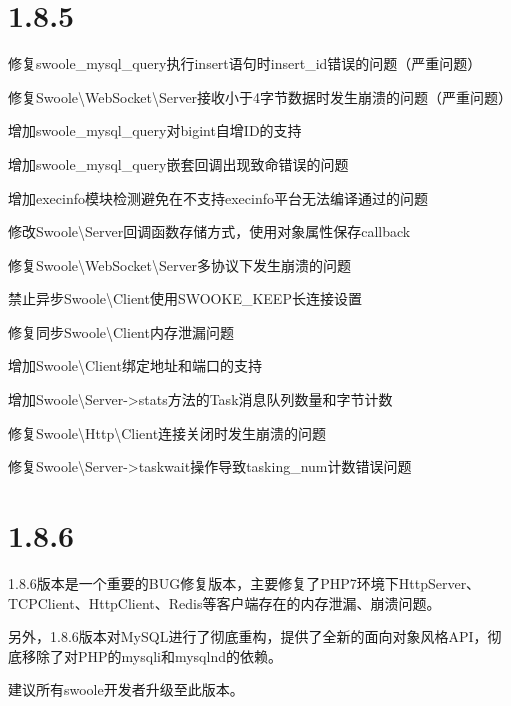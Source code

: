 \section{1.8.5}


\begin{compactitem}
\item 修复swoole\_mysql\_query执行insert语句时insert\_id错误的问题（严重问题）
\item 修复Swoole\textbackslash WebSocket\textbackslash Server接收小于4字节数据时发生崩溃的问题（严重问题）
\item 增加swoole\_mysql\_query对bigint自增ID的支持
\item 增加swoole\_mysql\_query嵌套回调出现致命错误的问题
\item 增加execinfo模块检测避免在不支持execinfo平台无法编译通过的问题
\item 修改Swoole\textbackslash Server回调函数存储方式，使用对象属性保存callback
\item 修复Swoole\textbackslash WebSocket\textbackslash Server多协议下发生崩溃的问题
\item 禁止异步Swoole\textbackslash Client使用SWOOKE\_KEEP长连接设置
\item 修复同步Swoole\textbackslash Client内存泄漏问题
\item 增加Swoole\textbackslash Client绑定地址和端口的支持
\item 增加Swoole\textbackslash Server->stats方法的Task消息队列数量和字节计数
\item 修复Swoole\textbackslash Http\textbackslash Client连接关闭时发生崩溃的问题
\item 修复Swoole\textbackslash Server->taskwait操作导致tasking\_num计数错误问题
\end{compactitem}

\section{1.8.6}


1.8.6版本是一个重要的BUG修复版本，主要修复了PHP7环境下HttpServer、TCPClient、HttpClient、Redis等客户端存在的内存泄漏、崩溃问题。

另外，1.8.6版本对MySQL进行了彻底重构，提供了全新的面向对象风格API，彻底移除了对PHP的mysqli和mysqlnd的依赖。

建议所有swoole开发者升级至此版本。


